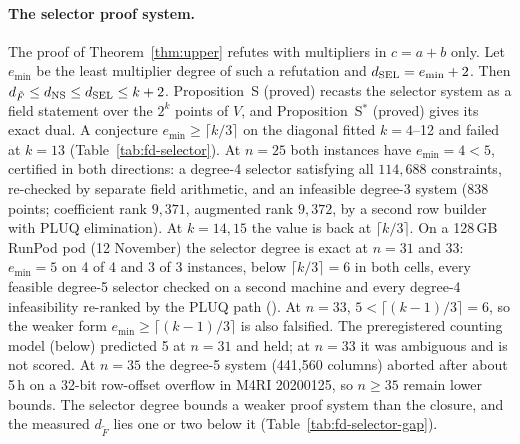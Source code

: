 \paragraph{The selector proof system.} The proof of
Theorem~\ref{thm:upper} refutes with multipliers in $c=a+b$ only. Let
$e_{\min}$ be the least multiplier degree of such a refutation and
$d_{\rm SEL}=e_{\min}+2$. Then
$d_{\tilde F}\le d_{\rm NS}\le d_{\rm SEL}\le k+2$. Proposition~S (proved)
recasts the selector system as a field statement over the $2^k$ points of
$V$, and Proposition~S$^*$ (proved) gives its exact dual. A conjecture
$e_{\min}\ge\lceil k/3\rceil$ on the diagonal fitted $k=4$--12 and failed at
$k=13$ (Table~\ref{tab:fd-selector}). At $n=25$ both instances have
$e_{\min}=4<5$, certified in both directions: a degree-4 selector satisfying
all $114{,}688$ constraints, re-checked by separate field arithmetic, and an
infeasible degree-3 system (838 points; coefficient rank $9{,}371$, augmented
rank $9{,}372$, by a second row builder with PLUQ elimination). At $k=14,15$
the value is back at $\lceil k/3\rceil$. On a 128\,GB RunPod pod
(12 November) the selector degree is exact at $n=31$ and 33: $e_{\min}=5$ on
4 of 4 and 3 of 3 instances, below $\lceil k/3\rceil=6$ in both cells, every feasible degree-5 selector checked on a
second machine and every degree-4 infeasibility re-ranked by the PLUQ path
(). At
$n=33$, $5<\lceil(k-1)/3\rceil=6$, so the weaker form
$e_{\min}\ge\lceil(k-1)/3\rceil$ is also falsified. The preregistered
counting model (below) predicted 5 at $n=31$ and held; at $n=33$ it was
ambiguous and is not scored. At $n=35$ the degree-5 system (441{,}560
columns) aborted after about 5\,h on a 32-bit row-offset overflow in M4RI
20200125, so $n\ge35$ remain lower bounds. The selector degree bounds a weaker proof
system than the closure, and the measured $d_{\tilde F}$ lies one or two
below it (Table~\ref{tab:fd-selector-gap}).

